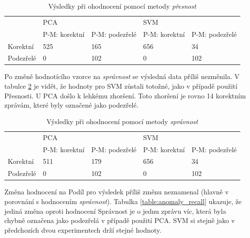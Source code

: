 \documentclass[thesis=M,czech]{FITthesis}[2012/10/20]
\begin{document}
			\begin{table}[htb]\centering
				\centering
				\caption{Výsledky při ohodnocení pomocí metody \textit{přesnost}}
				\label{table:anomaly_accuracy}
				\begin{tabular}{|l|l|l|l|l|}
					\hline
					\multirow{2}{*}{} & \multicolumn{2}{l|}{PCA}                 & \multicolumn{2}{l|}{SVM}                 \\ 
					& P-M: korektní & P-M: podezřelé & P-M: korektní & P-M: podezřelé \\ \hline
					Korektní          & 525                & 165                 & 656                & 34                  \\ \hline
					Podezřelé         & 0                  & 102                 & 0                  & 102                 \\ \hline
				\end{tabular}
			\end{table}
		
			Po změně hodnotícího vzorce na \textit{správnost} se výsledná data příliš nezměnila. V tabulce \ref{table:anomaly_precision} je vidět, že hodnoty pro SVM zůstali totožné, jako v případě použití Přesnosti. U PCA došlo k lehkému zhoršení. Toto zhoršení je rovno 14 korektním zprávám, které byly označené jako podezřelé.
		
			\begin{table}[htb]\centering
				\centering
				\caption{Výsledky při ohodnocení pomocí metody \textit{správnost}}
				\label{table:anomaly_precision}
				\begin{tabular}{|l|l|l|l|l|}
					\hline
					\multirow{2}{*}{} & \multicolumn{2}{l|}{PCA}                 & \multicolumn{2}{l|}{SVM}                 \\ 
					& P-M: korektní & P-M: podezřelé & P-M: korektní & P-M: podezřelé \\ \hline
					Korektní          & 511                & 179                 & 656                & 34                  \\ \hline
					Podezřelé         & 0                  & 102                 & 0                  & 102                 \\ \hline
				\end{tabular}
			\end{table}
		
			Změna hodnocení na Podíl pro výsledek příliš změnu neznamenal (hlavně v porovnání s hodnocením \textit{správnost}). Tabulka \ref{table:anomaly_recall} ukazuje, že jediná změna oproti hodnocení Správnost je o jednu zprávu víc, která byla chybně označena jako podezřelá v případě použití PCA. SVM si stejně jako v předchozích dvou experimentech drží stejné hodnoty.
			
\end{document}
